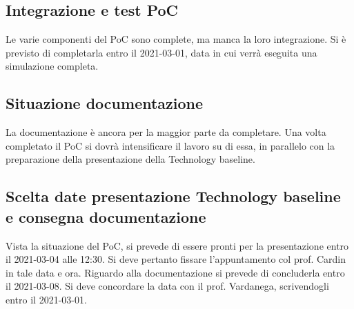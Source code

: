 \subsection*{Integrazione e test PoC}
Le varie componenti del PoC sono complete, ma manca la loro integrazione. Si è previsto di completarla entro il 2021-03-01, data in cui verrà eseguita una simulazione completa.

\subsection*{Situazione documentazione}
La documentazione è ancora per la maggior parte da completare. Una volta completato il PoC si dovrà intensificare il lavoro su di essa, in parallelo con la preparazione della presentazione della Technology baseline.

\subsection*{Scelta date presentazione Technology baseline e consegna documentazione}
Vista la situazione del PoC, si prevede di essere pronti per la presentazione entro il 2021-03-04 alle 12:30. Si deve pertanto fissare l'appuntamento col prof. Cardin in tale data e ora.
Riguardo alla documentazione si prevede di concluderla entro il 2021-03-08. Si deve concordare la data con il prof. Vardanega, scrivendogli entro il 2021-03-01.

